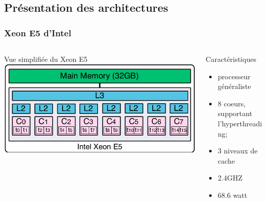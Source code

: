 \documentclass[10pt]{beamer}
\newcommand{\xeon}{{\small \textsf{Xeon E5}}\xspace}
\begin{document}
\subsection{Présentation des architectures}
\begin{frame}
\frametitle{Xeon E5 d'Intel}
  \begin{columns}[T]
    \begin{column}{.55\textwidth}
    \begin{block}{Vue simplifiée du \xeon}
    \includegraphics[scale=0.27]{figures/xeon}
    \end{block}
    \end{column}
    \begin{column}{.4\textwidth}
     \begin{block}{Caractéristiques}
      \begin{itemize}
       \item processeur généraliste
       \item 8 coeurs, supportant l'hyperthreading;
       \item 3 niveaux de cache
       \item 2.4GHZ
       \item 68.6 watt
      \end{itemize}
     \end{block}
    \end{column}
  \end{columns}
\end{frame}
\end{document}
